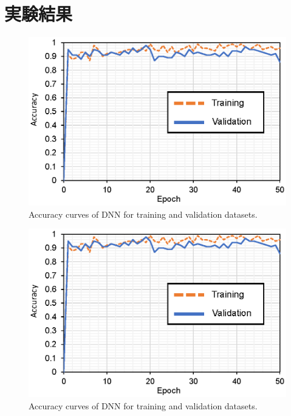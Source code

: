 \section{実験結果}
\label{sec:ex_res}
\begin{figure}[t]
    \begin{center}
        \includegraphics[width=0.85\columnwidth]{figures/accu.eps}
    \end{center}
    \vspace{-8pt}
	\caption{Accuracy curves of DNN for training and validation datasets.}
	\label{fig:accu}
\end{figure}

\begin{figure}[t]
    \begin{center}
        \includegraphics[width=0.85\columnwidth]{figures/accu.eps}
    \end{center}
    \vspace{-8pt}
	\caption{Accuracy curves of DNN for training and validation datasets.}
	\label{fig:01mat}
\end{figure}



